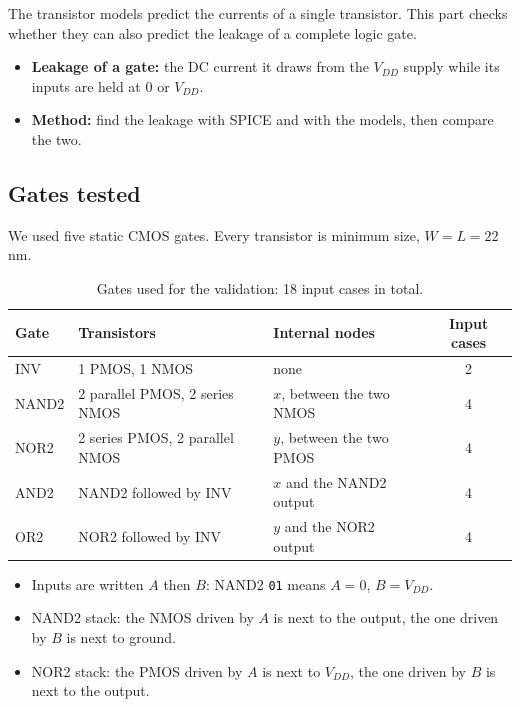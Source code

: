 \documentclass[11pt]{article}
\begin{document}
The transistor models predict the currents of a single transistor. This part
checks whether they can also predict the leakage of a complete logic gate.
\begin{itemize}
    \item \textbf{Leakage of a gate:} the DC current it draws from the
          $V_{DD}$ supply while its inputs are held at 0 or $V_{DD}$.
    \item \textbf{Method:} find the leakage with SPICE and with the models,
          then compare the two.
\end{itemize}

\subsection{Gates tested}

We used five static CMOS gates. Every transistor is minimum size,
$W = L = 22$\,nm.

\begin{table}[H]
\centering
\begin{tabular}{lllc}
\toprule
Gate & Transistors & Internal nodes & Input cases \\
\midrule
INV   & 1 PMOS, 1 NMOS                   & none                      & 2 \\
NAND2 & 2 parallel PMOS, 2 series NMOS   & $x$, between the two NMOS & 4 \\
NOR2  & 2 series PMOS, 2 parallel NMOS   & $y$, between the two PMOS & 4 \\
AND2  & NAND2 followed by INV            & $x$ and the NAND2 output  & 4 \\
OR2   & NOR2 followed by INV             & $y$ and the NOR2 output   & 4 \\
\bottomrule
\end{tabular}
\caption{Gates used for the validation: 18 input cases in total.}
\label{tab:gates}
\end{table}

\begin{itemize}
    \item Inputs are written $A$ then $B$: NAND2 \texttt{01} means $A = 0$,
          $B = V_{DD}$.
    \item NAND2 stack: the NMOS driven by $A$ is next to the output, the one
          driven by $B$ is next to ground.
    \item NOR2 stack: the PMOS driven by $A$ is next to $V_{DD}$, the one
          driven by $B$ is next to the output.
\end{itemize}
\end{document}
